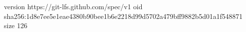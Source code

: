 version https://git-lfs.github.com/spec/v1
oid sha256:1d8e7ee5e1eae4380b90bee1b6e2218d99d5702a479bff9882b5d01a1f548871
size 126
